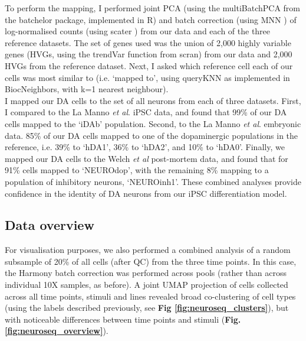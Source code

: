 To perform the mapping, I performed joint PCA (using the multiBatchPCA from the batchelor package, implemented in R) and batch correction (using MNN \cite{haghverdi2018batch}) of log-normalised counts (using scater \cite{mccarthy2017scater}) from our data and each of the three reference datasets. 
The set of genes used was the union of 2,000 highly variable genes (HVGs, using the trendVar function from scran) from our data and 2,000 HVGs from the reference dataset. 
Next, I asked which reference cell each of our cells was most similar to (i.e. ‘mapped to', using queryKNN as implemented in BiocNeighbors, with k=1 nearest neighbour).\\

I mapped our DA cells to the set of all neurons from each of three datasets.
First, I compared to the La Manno \textit{et al}. iPSC data, and found that 99\% of our DA cells mapped to the `iDAb' population.
Second, to the La Manno \textit{et al}. embryonic data. 
85\% of our DA cells mapped to one of the dopaminergic populations in the reference, i.e. 39\% to `hDA1', 36\% to `hDA2', and 10\% to `hDA0'.
Finally, we mapped our DA cells to the Welch \textit{et al} post-mortem data, and found that for 91\% cells mapped to `NEUROdop', with the remaining 8\% mapping to a population of inhibitory neurons, `NEUROinh1'.
These combined analyses provide confidence in the identity of DA neurons from our iPSC differentiation model.

\newpage

\subsection{Data overview}

For visualisation purposes, we also performed a combined analysis of a random subsample of 20\% of all cells (after QC) from the three time points.
In this case, the Harmony batch correction was performed across pools (rather than across individual 10X samples, as before).
A joint UMAP projection of cells collected across all time points, stimuli and lines revealed broad co-clustering of cell types (using the labels described previously, see \textbf{Fig \ref{fig:neuroseq_clusters}}), but with noticeable differences between time points and stimuli (\textbf{Fig. \ref{fig:neuroseq_overview}}). \\

